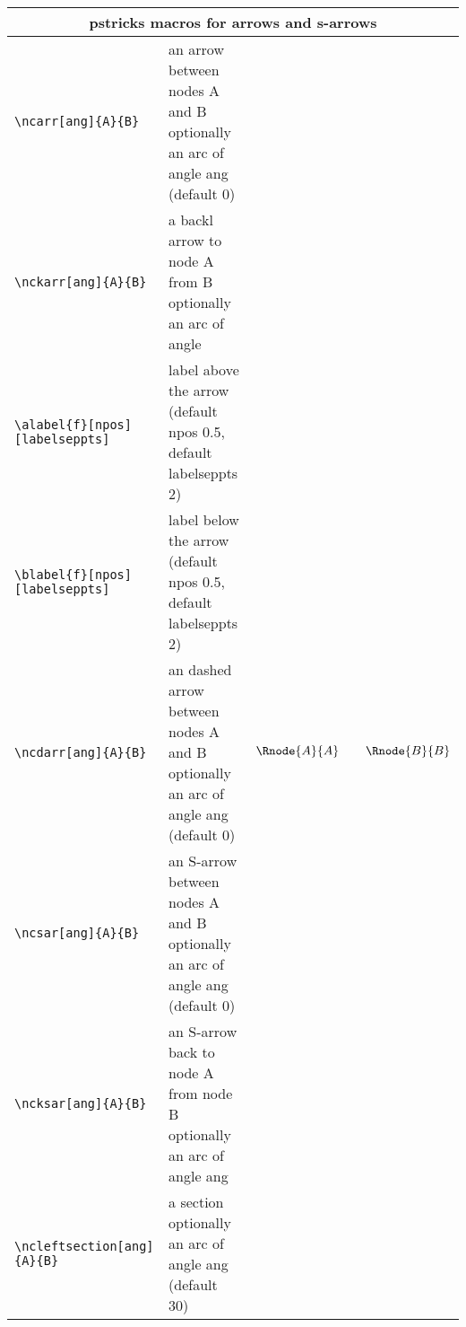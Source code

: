 \documentclass[10pt,a4paper]{article}
\begin{document}
\begin{tabular}{|l |  p{5cm} | c |}
		\hline
		\multicolumn{3}{|c|}{pstricks macros for arrows and s-arrows} \\
		   \hline	 
		   \verb!\ncarr[ang]{A}{B}! &  an arrow between nodes A and B optionally an arc of angle ang (default 0)
			& \raisebox{-0.3cm}{$$\Rnode{A}{A} \hspace{0.75cm} \Rnode{B}{B}$$ \ncarr{A}{B}}
      \\ 
      \hline    
       \verb!\nckarr[ang]{A}{B}! &  a backl arrow to node A from B optionally an arc of angle 
      & \raisebox{-0.3cm}{$$\Rnode{A}{A} \hspace{0.75cm} \Rnode{B}{B}$$ \nckarr{A}{B}}
      \\ 
      \hline       
       \verb!\alabel{f}[npos][labelseppts]! & label above the arrow (default npos 0.5, default labelseppts 2)
      & \raisebox{-0.3cm}{$$\Rnode{A}{A} \hspace{0.75cm} \Rnode{B}{B}$$ \ncarr{A}{B}\alabel{f}}
      \\  [0.3cm]     \hline       
       \verb!\blabel{f}[npos][labelseppts]! & label below the arrow (default npos 0.5, default labelseppts 2)
      & \raisebox{-0.3cm}{$$\Rnode{A}{A} \hspace{0.75cm} \Rnode{B}{B}$$ \ncarr{A}{B}\blabel{f}}
      \\ [0.6cm]
      \hline
%  
		   \verb!\ncdarr[ang]{A}{B}! &  an dashed arrow between nodes A and B optionally an arc of angle ang (default 0)
			& $$\Rnode{A}{A} \hspace{0.75cm} \Rnode{B}{B}$$ \ncdarr{A}{B}
			\\
			\hline
% 
		   \verb!\ncsar[ang]{A}{B}! &  an S-arrow between nodes A and B optionally an arc of angle ang (default 0)
			&
			\raisebox{-0.6cm}{$
\begin{array} {c}
\Rnode{A}{A} \\ [1.0cm]
\Rnode{B}{B}
\end{array}$\ncsar{A}{B}} \\
		 	 \hline	
% 
       \verb!\ncksar[ang]{A}{B}! &  an  S-arrow back to node A from node B optionally an arc of angle ang 
      &
      \raisebox{-0.6cm}{$
\begin{array} {c}
\Rnode{A}{A} \\ [1.0cm]
\Rnode{B}{B}
\end{array}$\ncksar{A}{B}} \\
       \hline 
%  
       \verb!\ncleftsection[ang]{A}{B}! &  a section optionally an arc of angle ang (default 30)

\end{tabular}
\end{document}
